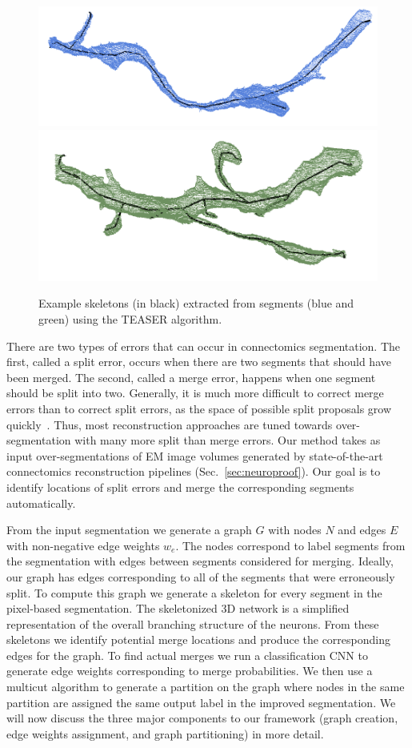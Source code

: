 \begin{figure}[t]
	\centering
	\includegraphics[width=0.92\linewidth]{./figures/skeleton1.png}
	\includegraphics[width=0.92\linewidth]{./figures/skeleton2.png}
	\caption{Example skeletons (in black) extracted from segments (blue and green) using the TEASER algorithm.}
	\label{fig:skeletonization}
\end{figure}

There are two types of errors that can occur in connectomics segmentation.
The first, called a split error, occurs when there are two segments that should have been merged. The second, called a merge error, happens when one segment should be split into two. Generally, it is much more difficult to correct merge errors than to correct split errors,
as the space of possible split proposals grow quickly~\cite{parag2015properties}.
Thus, most reconstruction approaches are tuned towards over-segmentation with many more split than merge errors. Our method takes as input over-segmentations of EM image volumes generated by state-of-the-art connectomics reconstruction pipelines (Sec.~\ref{sec:neuroproof}). Our goal is to identify locations of split errors and merge the corresponding segments automatically.

From the input segmentation we generate a graph $G$ with nodes $N$ and edges $E$ with non-negative edge weights $w_e$. The nodes correspond to label segments from the segmentation with edges between segments considered for merging. Ideally, our graph has edges corresponding to all of the segments that were erroneously split. To compute this graph we generate a skeleton for every segment in the pixel-based segmentation. The skeletonized 3D network is a simplified representation of the overall branching structure of the neurons. From these skeletons we identify potential merge locations and produce the corresponding edges for the graph. To find actual merges we run a classification CNN to generate edge weights corresponding to merge probabilities. We then use a multicut algorithm to generate a partition on the graph where nodes in the same partition are assigned the same output label in the improved segmentation. We will now discuss the three major components to our framework (graph creation, edge weights assignment, and graph partitioning) in more detail.


